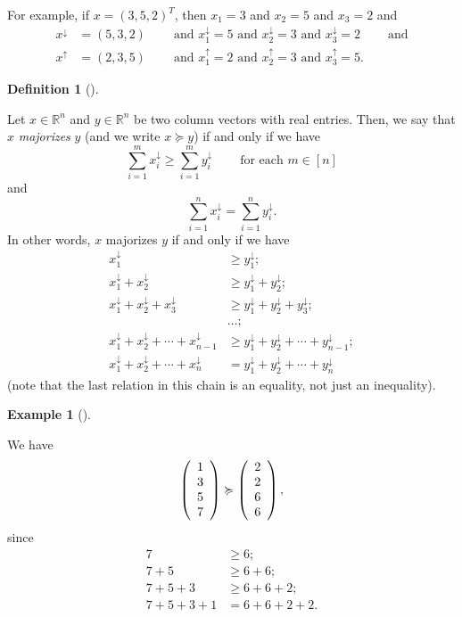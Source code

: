 \documentclass[numbers=enddot,12pt,final,onecolumn,notitlepage]{scrartcl}%
\numberwithin{exer}{subsection}
\theoremstyle{definition}
\newtheorem{defi}[theo]{Definition}
\newenvironment{definition}[1][]
{\begin{defi}[#1]\begin{leftbar}}
{\end{leftbar}\end{defi}}
\newtheorem{exam}[theo]{Example}
\newenvironment{example}[1][]
{\begin{exam}[#1]\begin{leftbar}}
{\end{leftbar}\end{exam}}
\let\sumnonlimits\sum
\renewcommand{\sum}{\sumnonlimits\limits}
\begin{document}
For example, if $x=\left(  3,5,2\right)  ^{T}$, then $x_{1}=3$ and $x_{2}=5$
and $x_{3}=2$ and%
\begin{align*}
x^{\downarrow}  &  =\left(  5,3,2\right)  \ \ \ \ \ \ \ \ \ \ \text{and }%
x_{1}^{\downarrow}=5\text{ and }x_{2}^{\downarrow}=3\text{ and }%
x_{3}^{\downarrow}=2\ \ \ \ \ \ \ \ \ \ \text{and}\\
x^{\uparrow}  &  =\left(  2,3,5\right)  \ \ \ \ \ \ \ \ \ \ \text{and }%
x_{1}^{\uparrow}=2\text{ and }x_{2}^{\uparrow}=3\text{ and }x_{3}^{\uparrow
}=5.
\end{align*}


\begin{definition}
\label{def.major.major}Let $x\in\mathbb{R}^{n}$ and $y\in\mathbb{R}^{n}$ be
two column vectors with real entries. Then, we say that $x$ \emph{majorizes}
$y$ (and we write $x\succcurlyeq y$) if and only if we have%
\[
\sum_{i=1}^{m}x_{i}^{\downarrow}\geq\sum_{i=1}^{m}y_{i}^{\downarrow
}\ \ \ \ \ \ \ \ \ \ \text{for each }m\in\left[  n\right]
\]
and%
\[
\sum_{i=1}^{n}x_{i}^{\downarrow}=\sum_{i=1}^{n}y_{i}^{\downarrow}.
\]
In other words, $x$ majorizes $y$ if and only if we have%
\begin{align*}
x_{1}^{\downarrow}  &  \geq y_{1}^{\downarrow};\\
x_{1}^{\downarrow}+x_{2}^{\downarrow}  &  \geq y_{1}^{\downarrow}%
+y_{2}^{\downarrow};\\
x_{1}^{\downarrow}+x_{2}^{\downarrow}+x_{3}^{\downarrow}  &  \geq
y_{1}^{\downarrow}+y_{2}^{\downarrow}+y_{3}^{\downarrow};\\
&  \ldots;\\
x_{1}^{\downarrow}+x_{2}^{\downarrow}+\cdots+x_{n-1}^{\downarrow}  &  \geq
y_{1}^{\downarrow}+y_{2}^{\downarrow}+\cdots+y_{n-1}^{\downarrow};\\
x_{1}^{\downarrow}+x_{2}^{\downarrow}+\cdots+x_{n}^{\downarrow}  &
=y_{1}^{\downarrow}+y_{2}^{\downarrow}+\cdots+y_{n}^{\downarrow}%
\end{align*}
(note that the last relation in this chain is an equality, not just an inequality).
\end{definition}

\begin{example}
We have%
\[
\left(
\begin{array}
[c]{c}%
1\\
3\\
5\\
7
\end{array}
\right)  \succcurlyeq\left(
\begin{array}
[c]{c}%
2\\
2\\
6\\
6
\end{array}
\right)  ,
\]
since%
\begin{align*}
7  &  \geq6;\\
7+5  &  \geq6+6;\\
7+5+3  &  \geq6+6+2;\\
7+5+3+1  &  =6+6+2+2.
\end{align*}

\end{example}
\end{document}
